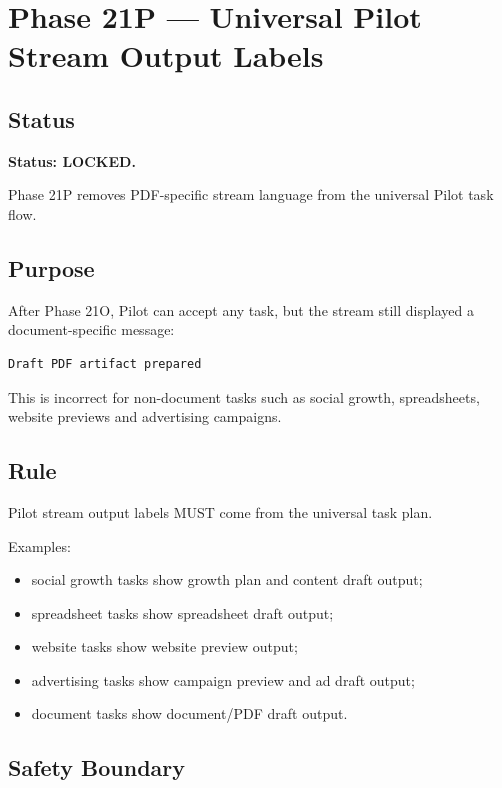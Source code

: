 \section{Phase 21P --- Universal Pilot Stream Output Labels}
\label{sec:aion-phase21p-universal-pilot-stream-output-labels}

\subsection{Status}

\textbf{Status: LOCKED.}

Phase 21P removes PDF-specific stream language from the universal Pilot task flow.

\subsection{Purpose}

After Phase 21O, Pilot can accept any task, but the stream still displayed a document-specific message:

\begin{verbatim}
Draft PDF artifact prepared
\end{verbatim}

This is incorrect for non-document tasks such as social growth, spreadsheets, website previews and advertising campaigns.

\subsection{Rule}

Pilot stream output labels MUST come from the universal task plan.

Examples:

\begin{itemize}
  \item social growth tasks show growth plan and content draft output;
  \item spreadsheet tasks show spreadsheet draft output;
  \item website tasks show website preview output;
  \item advertising tasks show campaign preview and ad draft output;
  \item document tasks show document/PDF draft output.
\end{itemize}

\subsection{Safety Boundary}

